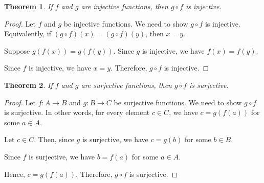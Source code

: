\documentclass{article}
\newtheorem{theorem}{Theorem}
\begin{document}
\begin{theorem}
If $f$ and $g$ are injective functions, then $g \circ f$ is injective.
\end{theorem}
\begin{proof}
Let $f$ and $g$ be injective functions. We need to show $g \circ f$ is injective.
Equivalently, if $(g \circ f)(x)=(g \circ f)(y)$, then $x=y$.

Suppose $g(f(x))=g(f(y))$. Since $g$ is injective, we have $f(x)=f(y)$.

Since $f$ is injective, we have $x=y$. Therefore, $g \circ f$ is injective.
\end{proof}
\begin{theorem}
If $f$ and $g$ are surjective functions, then $g \circ f$ is surjective.
\end{theorem}
\begin{proof}
Let $f: A \rightarrow B$ and $g: B \rightarrow C$ be surjective functions.
We need to show $g \circ f$ is surjective. In other words,
for every element $c \in C$, we have $c=g(f(a))$ for some $a \in A$.

Let $c \in C$. Then, since $g$ is surjective, we have $c=g(b)$ for some $b \in B$.

Since $f$ is surjective, we have $b=f(a)$ for some $a \in A$.

Hence, $c=g(f(a))$. Therefore, $g \circ f$ is surjective.
\end{proof}
\end{document}
